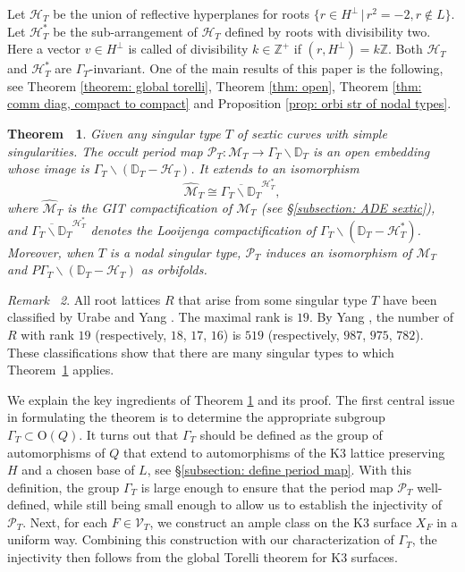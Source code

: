 \documentclass[12pt,reqno,a4paper]{amsart}
\newtheorem{thm}{Theorem~}[section]
\theoremstyle{remark}
\newtheorem{rmk}[thm]{Remark~}
\theoremstyle{definition}
\newcommand{\ZZ}{\mathbb{Z}}
\newcommand{\DD}{\mathbb{D}}
\newcommand{\Prd}{\mathscr{P}}
\newcommand{\calH}{\mathcal{H}}
\newcommand{\calM}{\mathcal{M}}
\newcommand{\calV}{\mathcal{V}}
\newcommand\Or{\mathrm{O}}
\newcommand{\Pic}{\mathrm{Pic}}
\newcommand{\bs}{\backslash}
\begin{document}
Let $\calH_T$ be the union of reflective hyperplanes for roots $\{ r\in H^\perp \,|\, r^2=-2, r\notin L \}$.
Let $\calH_T^*$ be the sub-arrangement of $\calH_T$ defined by roots with divisibility two. Here a vector $v\in H^\perp$ is called of divisibility $k\in \ZZ^+$ if $(r, H^\perp)=k\ZZ$.  Both $\calH_T$ and $\calH_T^*$ are  $\Gamma_T$-invariant. 
One of the main results of this paper is the following, see Theorem \ref{theorem: global torelli}, Theorem \ref{thm: open}, Theorem \ref{thm: comm diag, compact to compact} and Proposition \ref{prop: orbi str of nodal types}.
\begin{thm}
\label{thm: main in intro}
Given any singular type $T$ of sextic curves with simple singularities. The occult period map $\Prd_T\colon \calM_T \to \Gamma_{T}\bs \DD_T$ is an open embedding whose image is $\Gamma_T\bs(\DD_T-\calH_T)$.
It extends to an isomorphism  
    \[  
    \widehat{\calM}_T \cong \overline{\Gamma_T \bs \DD_T}^{\calH_T^*},  
    \]  
    where $\widehat{\calM}_T$ is the GIT compactification of $\calM_T$ (see \S \ref{subsection: ADE sextic}), and $\overline{\Gamma_T \bs \DD_T}^{\calH_T^*}$ denotes the Looijenga compactification of $\Gamma_T \bs (\DD_T - \calH_T^*)$. 
    Moreover, when $T$ is a nodal singular type, $\Prd_T$ induces an isomorphism of $\calM_T$ and $P\Gamma_T\bs(\DD_T-\calH_T)$ as orbifolds.
\end{thm}
\begin{rmk}
    All root lattices $R$ that arise from some singular type $T$ have been classified by Urabe \cite{urabe1988combinations} and Yang \cite{yang1996sextic}. The maximal rank is $19$.
    By Yang \cite[Thm 2.1]{yang1996sextic}, the number of $R$ with rank $19$ (respectively, $18$, $17$, $16$) is $519$ (respectively, $987$, $975$, $782$).
    These classifications show that there are many singular types to which Theorem~\ref{thm: main in intro} applies.
\end{rmk}

We explain the key ingredients of Theorem \ref{thm: main in intro} and its proof. The first central issue in formulating the theorem is to determine the appropriate subgroup $\Gamma_T \subset \Or(Q)$. It turns out that $\Gamma_T$ should be defined as the group of automorphisms of $Q$ that extend to automorphisms of the K3 lattice preserving $H$ and a chosen base of $L$, see \S\ref{subsection: define period map}. With this definition, the group $\Gamma_T$ is large enough to ensure that the period map $\Prd_T$ well-defined, while still being small enough to allow us to establish the injectivity of $\Prd_T$. 
Next, for each $F\in\calV_T$, we construct an ample class on the K3 surface $X_F$ in a uniform way. 
Combining this construction with our characterization of $\Gamma_T$, the injectivity then follows from the global Torelli theorem for K3 surfaces.
\end{document}
